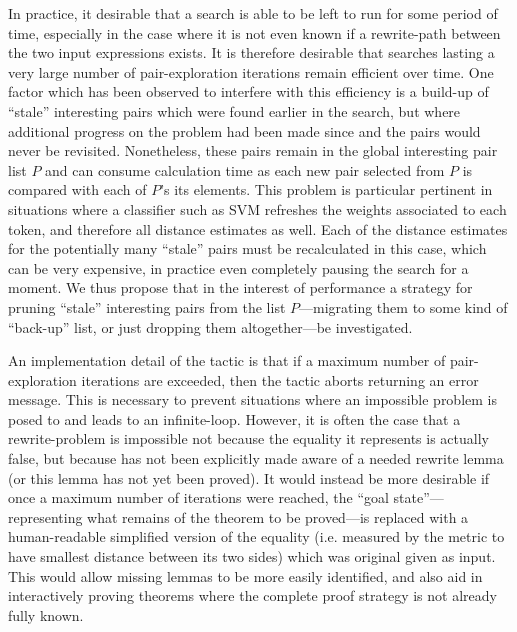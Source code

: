 \documentclass[12pt]{easychair}
\begin{document}
In practice, it desirable that a search is able to be left to run for some period of time, especially in the case where it is not even known if a rewrite-path between the two input expressions exists. It is therefore desirable that searches lasting a very large number of pair-exploration iterations remain efficient over time. One factor which has been observed to interfere with this efficiency is a build-up of ``stale'' interesting pairs which were found earlier in the search, but where additional progress on the problem had been made since and the pairs would never be revisited. Nonetheless, these pairs remain in the global interesting pair list $P$ and can consume calculation time as each new pair selected from $P$ is compared with each of $P$'s its elements. This problem is particular pertinent in situations where a classifier such as SVM refreshes the weights associated to each token, and therefore all distance estimates as well. Each of the distance estimates for the potentially many ``stale'' pairs must be recalculated in this case, which can be very expensive, in practice even completely pausing the search for a moment. We thus propose that in the interest of performance a strategy for pruning ``stale'' interesting pairs from the list $P$---migrating them to some kind of ``back-up'' list, or just dropping them altogether---be investigated.

An implementation detail of the  tactic is that if a maximum number of pair-exploration iterations are exceeded, then the tactic aborts returning an error message. This is necessary to prevent situations where an impossible problem is posed to  and leads to an infinite-loop. However, it is often the case that a rewrite-problem is impossible not because the equality it represents is actually false, but because  has not been explicitly made aware of a needed rewrite lemma (or this lemma has not yet been proved). It would instead be more desirable if once a maximum number of iterations were reached, the ``goal state''---representing what remains of the theorem to be proved---is replaced with a human-readable simplified version of the equality (i.e. measured by the metric to have smallest distance between its two sides) which was original given as input. This would allow missing lemmas to be more easily identified, and also aid in interactively proving theorems where the complete proof strategy is not already fully known.
\end{document}
